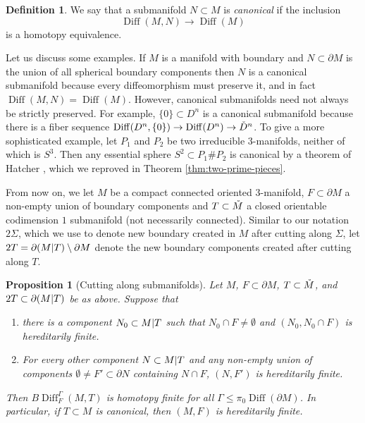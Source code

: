 \documentclass{amsart}
\theoremstyle{plain}
\newtheorem{prop}[thm]{Proposition}
\theoremstyle{definition}
\newtheorem{defn}[thm]{Definition}
\DeclareMathOperator\Diff{Diff}
\newcommand{\interior}[1]{\smash{\mathring{#1}}}
\newcommand{\ca}{\smash{\mid}} %
\newcommand{\BDiff}{B\!\Diff}
\begin{document}
\begin{defn}\label{defn:canonical}
    We say that a submanifold $N \subset M$ is \emph{canonical} if the inclusion
    \[
        \Diff(M, N) \to \Diff(M)
    \]
    is a homotopy equivalence.
\end{defn}

    Let us discuss some examples. If $M$ is a manifold with boundary and $N \subset \partial M$ is the union of all spherical boundary components then $N$ is a canonical submanifold because every diffeomorphism must preserve it, and in fact $\Diff(M, N) = \Diff(M)$.
    However, canonical submanifolds need not always be strictly preserved.
    For example, $\{0\} \subset D^n$ is a canonical submanifold because there is a fiber sequence $\Diff(D^n, \{0\}) \to \Diff(D^n) \to \interior{D}^n$.
    To give a more sophisticated example, let $P_1$ and $P_2$ be two irreducible $3$-manifolds, neither of which is $S^3$.
    Then any essential sphere $S^2 \subset P_1 \# P_2$ is canonical by a theorem of Hatcher \cite{Hatcher1981}, which we reproved in Theorem \ref{thm:two-prime-pieces}.

From now on, we let $M$ be a compact connected oriented $3$-manifold, $F \subset \partial M$ a non-empty union of boundary components and $T \subset \interior{M}$ a closed orientable codimension $1$ submanifold (not necessarily connected). Similar to our notation $2\Sigma$, which we use to denote new boundary created in $M$ after cutting along $\Sigma$, let $2T = \partial (M \ca T) \setminus \partial M$ denote the new boundary components created after cutting along $T$. 


\begin{prop}[Cutting along submanifolds]\label{prop:cut-along-sub}
    Let $M$, $F\subset \partial M$, $T\subset \interior{M}$, and $2T\subset \partial (M\ca T)$ be as above. 
    Suppose that 
    \begin{enumerate}
        \item[$(\dagger_0)$]
        there is a component $N_0 \subset M \ca T$ such that $N_0 \cap F \neq \emptyset$ and $(N_0, N_0 \cap F)$ is hereditarily finite.
        \item[$(\dagger)$]
        For every other component $N \subset M \ca T$ and any non-empty union of components $\emptyset \neq F' \subset \partial N$ containing $N \cap F$, $(N, F')$ is hereditarily finite.
    \end{enumerate}
    Then $\BDiff_F^{\Gamma}(M, T)$ is homotopy finite for all $\Gamma \le \pi_0\Diff(\partial M)$.
    In particular, if $T \subset M$ is canonical, then $(M, F)$ is hereditarily finite.
\end{prop}
\end{document}
